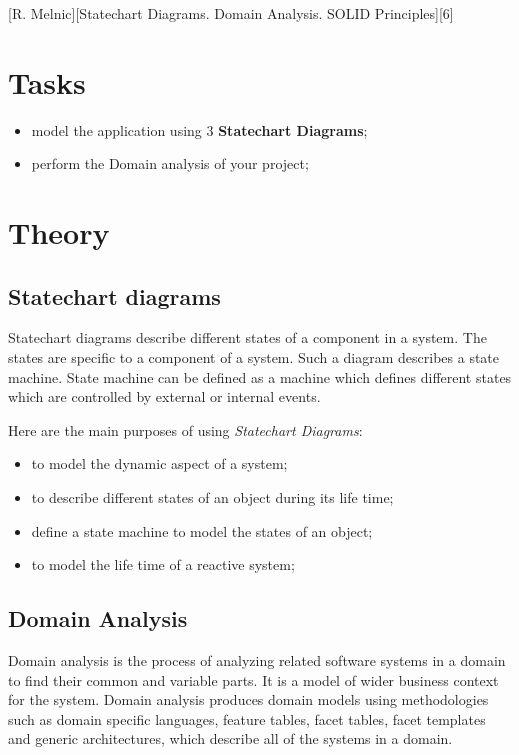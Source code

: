 \documentclass{article}
\begin{document}
	[R. Melnic][Statechart Diagrams. Domain Analysis. SOLID Principles][6]

	\section{Tasks}
		\begin{itemize}
			\item model the application using 3 \textbf{Statechart Diagrams};
			\item perform the Domain analysis of your project;
		\end{itemize}

	\section{Theory}
		\subsection{Statechart diagrams}
			Statechart diagrams describe different states of a component in a system. The states are specific to a component of a system. Such a diagram describes a state machine. State machine can be defined as a machine which defines different states which are controlled by external or internal events.

			\bigskip
			Here are the main purposes of using \textit{Statechart Diagrams}:
			\begin{itemize}
				\item to model the dynamic aspect of a system;
				\item to describe different states of an object during its life time;
				\item define a state machine to model the states of an object;
				\item to model the life time of a reactive system;
			\end{itemize}

		\subsection{Domain Analysis}
			Domain analysis is the process of analyzing related software systems in a domain to find their common and variable parts. It is a model of wider business context for the system. Domain analysis produces domain models using methodologies such as domain specific languages, feature tables, facet tables, facet templates and generic architectures, which describe all of the systems in a domain.
\end{document}
